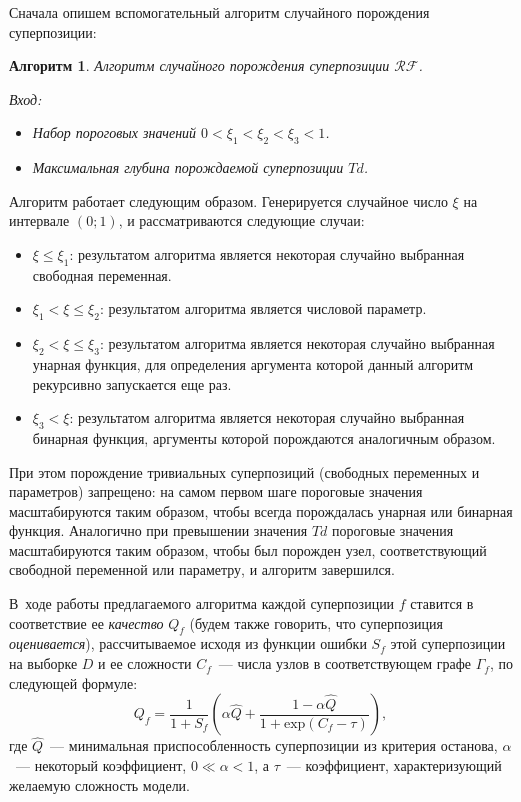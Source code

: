 \documentclass[12pt,a4paper]{article}
\newtheorem{algo}{Алгоритм}
\begin{document}
Сначала опишем вспомогательный алгоритм случайного порождения суперпозиции:

\begin{algo}
  \label{algo:RF}
  Алгоритм случайного порождения суперпозиции $\mathcal{RF}$.

  Вход:
  \begin{itemize}
	\item Набор пороговых значений $0 < \xi_1 < \xi_2 < \xi_3 < 1$.
	\item Максимальная глубина порождаемой суперпозиции $Td$.
  \end{itemize}
\end{algo}

Алгоритм работает следующим образом. Генерируется случайное число $\xi$ на
интервале $(0; 1)$, и рассматриваются следующие случаи:
\begin{itemize}
  \item $\xi \leq \xi_1$: результатом алгоритма является некоторая случайно
	выбранная свободная переменная.
  \item $\xi_1 < \xi \leq \xi_2$: результатом алгоритма является	числовой
	параметр.
  \item $\xi_2 < \xi \leq \xi_3$: результатом алгоритма является некоторая
	случайно выбранная унарная функция, для определения аргумента которой
	данный алгоритм рекурсивно запускается еще раз.
  \item $\xi_3 < \xi$: результатом алгоритма является некоторая случайно
	выбранная бинарная функция, аргументы которой порождаются аналогичным
	образом.
\end{itemize}

При этом порождение тривиальных суперпозиций (свободных переменных и
параметров) запрещено: на самом первом шаге пороговые значения масштабируются
таким образом, чтобы всегда порождалась унарная или бинарная функция.
Аналогично при превышении значения $Td$ пороговые значения масштабируются
таким образом, чтобы был порожден узел, соответствующий свободной переменной
или параметру, и алгоритм завершился.

В~ходе работы предлагаемого алгоритма каждой суперпозиции $f$ ставится в
соответствие ее \emph{качество} $Q_f$ (будем также говорить, что
суперпозиция \emph{оценивается}), рассчитываемое исходя из функции ошибки
$S_f$ этой суперпозиции на выборке $D$ и ее сложности $C_f$~---
числа узлов в соответствующем графе $\Gamma_f$, по следующей формуле:
\begin{equation}
  \label{eq:q_f}
  Q_f = \frac{1}{1 + S_f} \left(\alpha \hat{Q} + \frac{1 - \alpha \hat{Q}}{1 + \text{exp} (C_f - \tau)}\right),
\end{equation}
где $\hat{Q}$~--- минимальная приспособленность суперпозиции из критерия
останова, $\alpha$~--- некоторый коэффициент, $0 \ll \alpha < 1$, а
$\tau$~--- коэффициент, характеризующий желаемую сложность модели.
\end{document}
